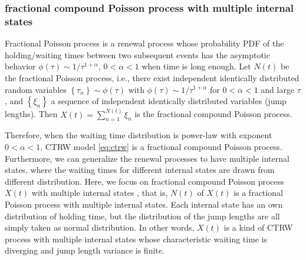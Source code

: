 \documentclass[aps, pre, preprint, amsmath, amssymb]{revtex4}
\newcommand{\dakuo}[1]{\left\{#1\right\}}
\begin{document}
\subsubsection{fractional compound Poisson process with multiple internal states}\label{sub:fcp}
Fractional Poisson process is a renewal process whose probability PDF of the holding/waiting times between two subsequent events has the asymptotic behavior $\phi(\tau)\sim 1/\tau^{1+\alpha}$, $0<\alpha<1$ when time is long enough. 
Let $N(t)$ be the fractional Poisson process, i.e., there exist independent identically distributed random variables $\dakuo{\tau_n}\sim \phi(\tau)$ with $\phi(\tau) \sim 1/\tau^{1+\alpha}$ for $0<\alpha<1$ and large $\tau$,
and $\dakuo{\xi_n}$ a sequence of independent identically distributed variables (jump lengths). Then $X(t)=\sum\limits_{n=1}^{N(t)}\xi_n$ is the fractional compound Poisson process. 

Therefore, when the waiting time distribution is power-law with exponent $0<\alpha<1$, CTRW model \eqref{eq:ctrw} is a fractional compound Poisson process. 
Furthermore, we can generalize the renewal processes to have multiple internal states, where the waiting times for different internal states are drawn from different distribution. 
Here, we focus on fractional compound Poisson process $X(t)$ with multiple internal states \cite{RN67}, that is, $N(t)$ of $X(t)$ is a fractional Poisson process with multiple internal states. Each internal state has an own distribution of holding time, but the distribution of the jump lengths are all simply taken as normal distribution. 
In other words, $X(t)$ is a kind of CTRW process with multiple internal states whose characteristic waiting time is diverging and jump length variance is finite.  
\end{document}
